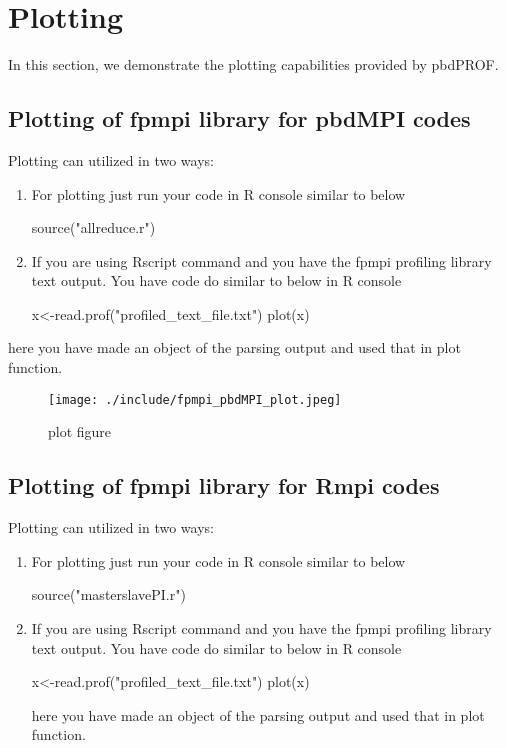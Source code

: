 \section{Plotting}
In this section, we demonstrate the plotting capabilities provided by pbdPROF.

\subsection{Plotting of fpmpi library for pbdMPI codes}
Plotting can utilized in two ways:
\begin{enumerate}
\item For plotting just run your code in R console similar to below 
\begin{Code}
source("allreduce.r")
\end{Code}
\item If you are using Rscript command and you have the fpmpi profiling library text output.
You have code do similar to below in R console
\begin{Code}
x<-read.prof("profiled_text_file.txt")
plot(x)
\end{Code}
\end{enumerate}
here you have made an object of the parsing output and used that in plot function.

\begin{figure}%
  \centering
  \texttt{[image: ./include/fpmpi\_pbdMPI\_plot.jpeg]}
  \caption{plot figure}
  \label{fig:plot_fpmpi}

\end{figure}


\subsection{Plotting of fpmpi library for Rmpi codes}
Plotting can utilized in two ways:
\begin{enumerate}
\item For plotting just run your code in R console similar to below 
\begin{Code}
source("masterslavePI.r")
\end{Code}
\item If you are using Rscript command and you have the fpmpi profiling library text output.
You have code do similar to below in R console
\begin{Code}
x<-read.prof("profiled_text_file.txt")
plot(x)
\end{Code}
here you have made an object of the parsing output and used that in plot function.
\end{enumerate}





